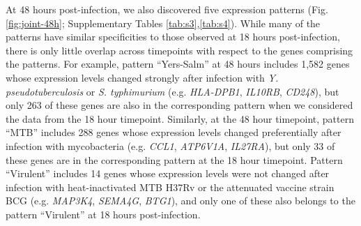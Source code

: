 At 48 hours post-infection, we also discovered five expression patterns
(Fig. \ref{fig:joint-48h}; Supplementary Tables \ref{tab:s3},\ref{tab:s4}). While many of the patterns have
similar specificities to those observed at 18 hours post-infection,
there is only little overlap across timepoints with respect to the genes
comprising the patterns. For example, pattern ``Yers-Salm'' at 48 hours
includes 1,582 genes whose expression levels changed strongly after
infection with \emph{Y. pseudotuberculosis} or \emph{S. typhimurium}
(e.g. \emph{HLA-DPB1}, \emph{IL10RB}, \emph{CD248}), but only 263 of
these genes are also in the corresponding pattern when we considered the
data from the 18 hour timepoint. Similarly, at the 48 hour timepoint,
pattern ``MTB'' includes 288 genes whose expression levels changed
preferentially after infection with mycobacteria (e.g. \emph{CCL1},
\emph{ATP6V1A}, \emph{IL27RA}), but only 33 of these genes are in the
corresponding pattern at the 18 hour timepoint. Pattern ``Virulent''
includes 14 genes whose expression levels were not changed after
infection with heat-inactivated MTB H37Rv or the attenuated vaccine
strain BCG (e.g. \emph{MAP3K4}, \emph{SEMA4G}, \emph{BTG1}), and only
one of these also belongs to the pattern ``Virulent'' at 18 hours
post-infection.

